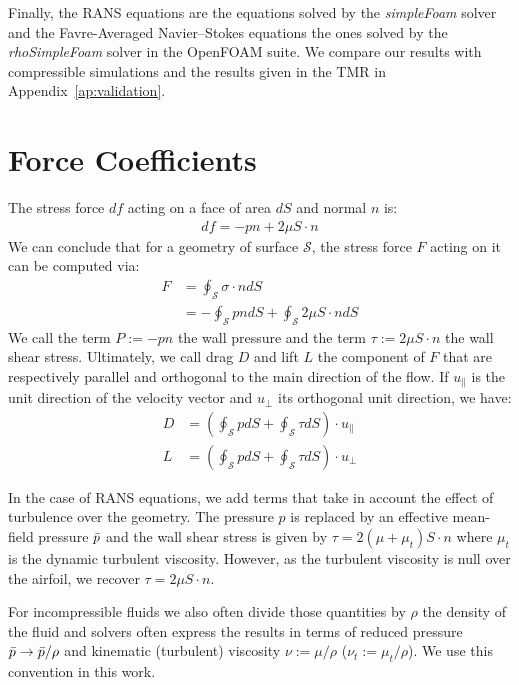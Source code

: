 \begin{subappendices}
	Finally, the \acrshort{RANS} equations are the equations solved by the \emph{simpleFoam} solver and the Favre-Averaged Navier–Stokes equations the ones solved by the \emph{rhoSimpleFoam} solver in the OpenFOAM suite. We compare our results with compressible simulations and the results given in the \acrshort{TMR} \cite{TMR} in Appendix~\ref{ap:validation}.
	
	\section{Force Coefficients}\label{ap:force}	
	The stress force $df$ acting on a face of area $dS$ and normal $n$ is:
	\begin{align}
		df = -pn + 2\mu S\cdot n
	\end{align}
	We can conclude that for a geometry of surface $\mathcal{S}$, the stress force $F$ acting on it can be computed via:
	\begin{align}
		F &= \oint_\mathcal{S} \sigma\cdot n dS \\
		&= -\oint_\mathcal{S} pndS + \oint_\mathcal{S} 2\mu S\cdot n dS
	\end{align}
	We call the term $P := -pn$ the wall pressure and the term $\tau := 2\mu S\cdot n$ the wall shear stress. Ultimately, we call drag $D$ and lift $L$ the component of $F$ that are respectively parallel and orthogonal to the main direction of the flow. If $u_{\parallel}$ is the unit direction of the velocity vector and $u_{\perp}$ its orthogonal unit direction, we have:
	\begin{align}
		D &= \left(\oint_\mathcal{S} p dS + \oint_\mathcal{S} \tau dS\right)\cdot u_{\parallel} \\
		L &= \left(\oint_\mathcal{S} p dS + \oint_\mathcal{S} \tau dS\right)\cdot u_{\perp}
	\end{align}
	
	In the case of \acrshort{RANS} equations, we add terms that take in account the effect of turbulence over the geometry. The pressure $p$ is replaced by an effective mean-field pressure $\Bar{p}$ and the wall shear stress is given by $\tau = 2(\mu + \mu_t)S\cdot n$ where $\mu_t$ is the dynamic turbulent viscosity. However, as the turbulent viscosity is null over the airfoil, we recover $\tau = 2\mu S\cdot n$.
	
	For incompressible fluids we also often divide those quantities by $\rho$ the density of the fluid and solvers often express the results in terms of reduced pressure $\Bar{p} \rightarrow \Bar{p}/\rho$ and kinematic (turbulent) viscosity $\nu := \mu/\rho$ ($\nu_t := \mu_t/\rho$). We use this convention in this work.
	

\end{subappendices}
